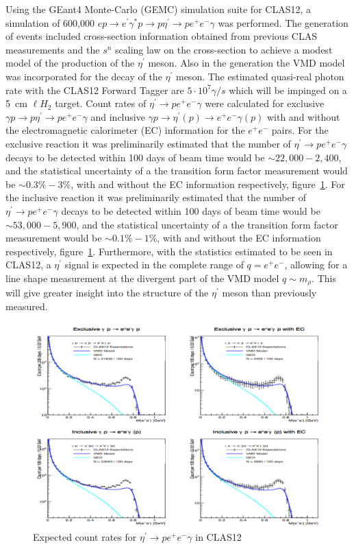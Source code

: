 \documentclass{aip-cp}
\begin{document}
Using the GEant4 Monte-Carlo (GEMC) simulation suite for CLAS12, a simulation of 600,000 $e p \to e^{\prime} \gamma^* p \to p \eta^{\prime}  \to p e^+ e^- \gamma $ was performed. The generation of events included cross-section information obtained from previous CLAS measurements and the $s^n$ scaling law on the cross-section to achieve a modest model of the production of the $\eta^{\prime} $ meson. Also in the generation the VMD model was incorporated for the decay of the $\eta^{\prime}$ meson. The estimated quasi-real photon rate with the CLAS12 Forward Tagger are $5 \cdot 10^7 \gamma / s$ which will be impinged on  a 5~cm $\ell H_2$ target. Count rates of $ \eta^{\prime}  \to p e^+ e^- \gamma $ were calculated for exclusive $\gamma p \to p \eta^{\prime}  \to p e^+ e^- \gamma $ and inclusive $\gamma p \to \eta^{\prime} (p)  \to  e^+ e^- \gamma (p) $ with and without the electromagnetic calorimeter (EC) information for the $ e^+ e^- $ pairs. For the exclusive reaction it was preliminarily estimated that the number of  $ \eta^{\prime}  \to p e^+ e^- \gamma $ decays to be detected within 100 days of beam time would be $\sim 22,000 - 2,400$, and the statistical uncertainty of a the transition form factor measurement would be $\sim 0.3 \% - 3 \%$, with and without the EC information respectively, figure~\ref{fig:clas12_etaP}. For the inclusive reaction it was preliminarily estimated that the number of  $ \eta^{\prime}  \to p e^+ e^- \gamma $ decays to be detected within 100 days of beam time would be $\sim 53,000 - 5,900$, and the statistical uncertainty of a the transition form factor measurement would be $\sim 0.1 \% - 1 \%$, with and without the EC information respectively, figure~\ref{fig:clas12_etaP}. Furthermore, with the statistics estimated to be seen in CLAS12, a $ \eta^{\prime} $ signal is expected in the complete range of $q = e^+ e^- $, allowing for a line shape measurement at the divergent part of the VMD model $q\sim m_{\rho}$. This will give greater insight into the structure of the $ \eta^{\prime} $ meson than previously measured. 
\begin{figure}[h!]
	\centerline{\includegraphics[width=300 pt, height=200 pt]{figures/clas12_etaP.pdf}}
	\caption{Expected count rates for $ \eta^{\prime}  \to p e^+ e^- \gamma $ in CLAS12}
	\label{fig:clas12_etaP}
\end{figure}
\end{document}
